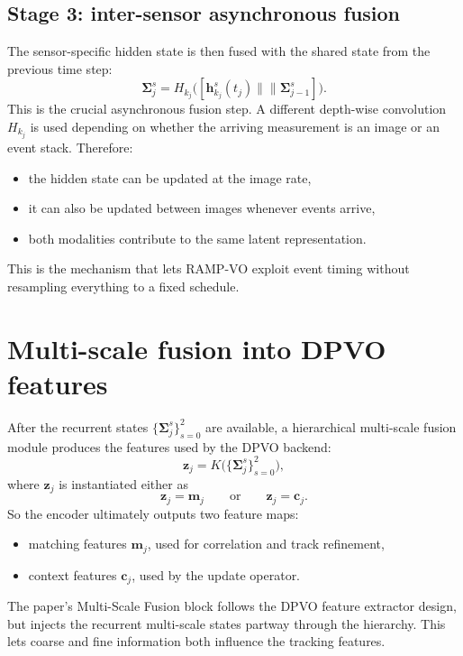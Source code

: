 \documentclass[11pt]{article}
\newcommand{\concat}{\mathbin{\|\!\|}}
\newcommand{\state}{\boldsymbol{\Sigma}}
\begin{document}
\subsection{Stage 3: inter-sensor asynchronous fusion}
The sensor-specific hidden state is then fused with the shared state from the previous time step:
\begin{equation}
\state_{j}^{s} = H_{k_j}\big([\mathbf{h}_{k_j}^{s}(t_j) \concat \state_{j-1}^{s}]\big).
\end{equation}
This is the crucial asynchronous fusion step.
A different depth-wise convolution \(H_{k_j}\) is used depending on whether the arriving measurement is an image or an event stack.
Therefore:
\begin{itemize}
    \item the hidden state can be updated at the image rate,
    \item it can also be updated between images whenever events arrive,
    \item both modalities contribute to the same latent representation.
\end{itemize}
This is the mechanism that lets RAMP-VO exploit event timing without resampling everything to a fixed schedule.

\section{Multi-scale fusion into DPVO features}

After the recurrent states \(\{\state_j^s\}_{s=0}^2\) are available, a hierarchical multi-scale fusion module produces the features used by the DPVO backend:
\begin{equation}
\mathbf{z}_j = K\big(\{\state_j^s\}_{s=0}^{2}\big),
\end{equation}
where \(\mathbf{z}_j\) is instantiated either as
\begin{equation}
\mathbf{z}_j = \mathbf{m}_j
\qquad \text{or} \qquad
\mathbf{z}_j = \mathbf{c}_j.
\end{equation}
So the encoder ultimately outputs two feature maps:
\begin{itemize}
    \item matching features \(\mathbf{m}_j\), used for correlation and track refinement,
    \item context features \(\mathbf{c}_j\), used by the update operator.
\end{itemize}
The paper's Multi-Scale Fusion block follows the DPVO feature extractor design, but injects the recurrent multi-scale states partway through the hierarchy.
This lets coarse and fine information both influence the tracking features.
\end{document}
